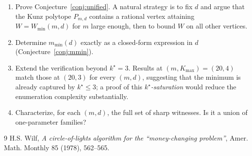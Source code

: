 \documentclass[11pt,a4paper]{article}
\begin{document}
\begin{enumerate}
  \item Prove Conjecture~\ref{conj:unified}. A natural strategy is
  to fix $d$ and argue that the Kunz polytope $P_{m,d}$ contains a
  rational vertex attaining $W = W_{\min}(m,d)$ for $m$ large enough,
  then to bound $W$ on all other vertices.
  \item Determine $m_{\min}(d)$ exactly as a closed-form expression
  in $d$ (Conjecture~\ref{conj:mmin}).
  \item Extend the verification beyond $k^\star = 3$. Results at
  $(m,K_{\max}) = (20,4)$ match those at $(20,3)$ for every
  $(m,d)$, suggesting that the minimum is already captured by
  $k^\star \le 3$; a proof of this \emph{$k^\star$-saturation} would
  reduce the enumeration complexity substantially.
  \item Characterize, for each $(m,d)$, the full set of sharp
  witnesses. Is it a union of one-parameter families?
\end{enumerate}


\begin{thebibliography}{9}
 H.S. Wilf, \emph{A circle-of-lights algorithm for
the ``money-changing problem''}, Amer. Math. Monthly 85 (1978),
562--565.
\end{thebibliography}
\end{document}
